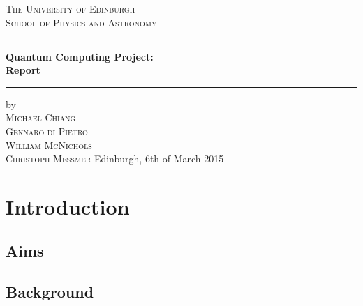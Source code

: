 \documentclass[bibliography=totocnumbered]{article}
\title{
 \titlename\\
  \vspace{2cm}
  \vspace{1cm}
}
\author{\authorname}
\date{}
\theoremstyle{NoticeStyle}
\begin{document}
\newpage
\begin{titlepage}
	\centering
	{\LARGE \textsc{The University of Edinburgh}}\\[5pt]
	{\large \textsc{School of Physics and Astronomy}}\\
	\vspace{80pt}
	
	\rule{\linewidth}{1pt}
	{
	\textbf{\LARGE Quantum Computing Project:\\Report}
	}
	\rule{\linewidth}{1pt}
	
	\vspace{80pt}
	{\large
		
	}
	
	\vspace{200pt}
	{\large
	by\\
	\textsc{Michael Chiang\\
	Gennaro di Pietro\\
	William McNichols\\
	Christoph Meßmer}
	}
	\vfill
	{\large Edinburgh, 6th of March 2015}
\end{titlepage}

\newpage


\tableofcontents
\newpage


%
\section{Introduction}

\subsection{Aims}

\subsection{Background}
\end{document}
